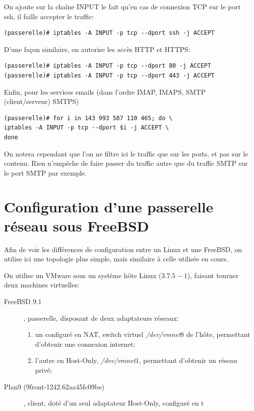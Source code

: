\documentclass[a4paper]{article}
\begin{document}
On ajoute sur la chaîne INPUT le fait qu'en cas de connexion
TCP sur le port ssh, il faille accepter le traffic:
\begin{verbatim}
(passerelle)# iptables -A INPUT -p tcp --dport ssh -j ACCEPT
\end{verbatim}

D'une façon similaire, on autorise les accès HTTP et HTTPS:
\begin{verbatim}
(passerelle)# iptables -A INPUT -p tcp --dport 80 -j ACCEPT
(passerelle)# iptables -A INPUT -p tcp --dport 443 -j ACCEPT
\end{verbatim}

Enfin, pour les services emails (dans l'ordre IMAP, IMAPS,
SMTP (client/serveur) SMTPS)
\begin{verbatim}
(passerelle)# for i in 143 993 587 110 465; do \
iptables -A INPUT -p tcp --dport $i -j ACCEPT \
done
\end{verbatim}

On notera cependant que l'on ne filtre ici le traffic que sur
les ports, et pas sur le contenu. Rien n'empêche de faire passer
du traffic autre que du traffic SMTP sur le port SMTP par exemple.


\newpage
\appendix

\section{Configuration d'une passerelle réseau sous FreeBSD}
Afin de voir les différences de configuration entre un Linux
et une FreeBSD, on utilise ici une topologie plus simple, mais
similaire à celle utilisée en cours.

On utilise un VMware sous un système hôte Linux ($3.7.5-1$),
faisant tourner deux machines virtuelles:
\begin{description}
	\item[FreeBSD 9.1], passerelle, disposant de deux adaptateurs
	réseaux:
	\begin{enumerate}
		\item un configuré en NAT, switch virtuel
			\textit{/dev/vmnet$8$} de l'hôte, permettant
			d'obtenir une connexion internet;
		\item l'autre en Host-Only, \textit{/dev/vmnet$1$},
			permettant d'obtenir un réseau privé;
	\end{enumerate}
	\item[Plan9 (9front-1242.62aa45fc09be)], client, doté
		d'un seul adaptateur Host-Only, configuré en t
\end{description}
\end{document}
